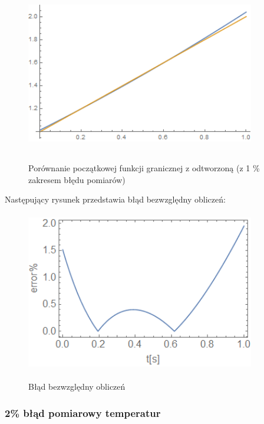 \documentclass[twoside]{projektInzynierskiMS1}
\begin{document}
\begin{figure}[H]
\begin{center}
		\includegraphics[height=7cm, width=10cm]{pics/1reconstruction.png}\\
	\caption{Porównanie początkowej funkcji granicznej z odtworzoną (z 1 \% zakresem błędu pomiarów)}
\end{center}
\end{figure}

Następujący rysunek przedstawia błąd bezwzględny obliczeń: \\

\begin{figure}[H]
\begin{center}
		\includegraphics[height=7cm, width=10cm]{pics/1abs.png}\\
	\caption{Błąd bezwzględny obliczeń}
\end{center}
\end{figure}



\subsubsection{2\% błąd pomiarowy temperatur}
\end{document}
